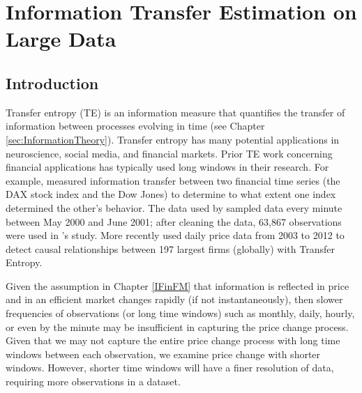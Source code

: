 \chapter{ Information Transfer Estimation on Large Data} \label{Chapter:PyIF}

\section{Introduction}


Transfer entropy (TE) is an information measure that quantifies the transfer of information between processes evolving in time (see Chapter \ref{sec:InformationTheory}). Transfer entropy has many potential applications in  neuroscience, social media, and financial markets. Prior TE work concerning financial applications has typically used long windows in their research. For example, \cite{Kantz} measured information transfer between two financial time series (the DAX stock index and the Dow Jones) to determine to what extent one index determined the other's behavior. The data used by \cite{Kantz} sampled data every minute between May 2000 and June 2001; after cleaning the data, 63,867 observations were used in \cite{Kantz}'s study.  More recently \cite{Sandoval} used daily price data from 2003 to 2012 to detect causal relationships between 197 largest firms (globally) with Transfer Entropy.

Given the assumption in Chapter \ref{IFinFM} that information is reflected in price and in an efficient market changes rapidly (if not instantaneously), then slower frequencies of observations (or long time windows) such as monthly, daily, hourly, or even by the minute may be insufficient in capturing the price change process.  Given that we may not capture the entire price change process with long time windows between each observation, we examine price change with shorter windows.  However, shorter time windows will have a finer resolution of data, requiring more observations in a dataset. 

